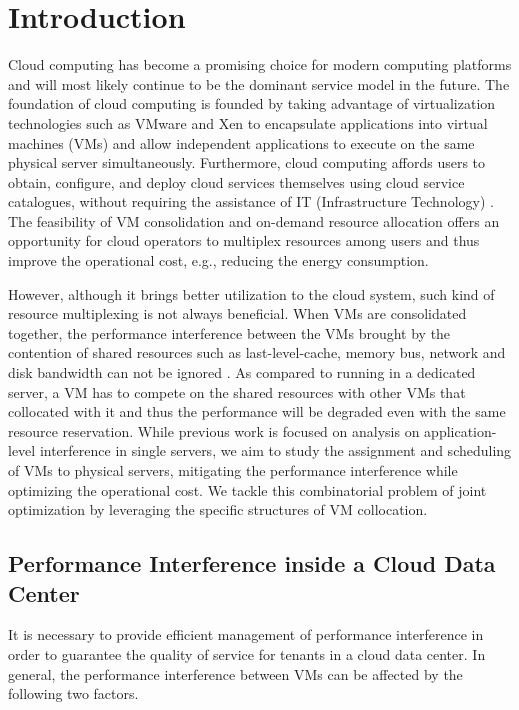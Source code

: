 \documentclass[10pt,journal]{IEEEtran}
\begin{document}
\IEEEpeerreviewmaketitle



\section{Introduction}




Cloud computing has become a promising choice for modern computing platforms and will most likely continue to be the dominant service model in the future. The foundation of cloud computing is founded by taking advantage of virtualization technologies such as VMware \cite{VMware} and Xen \cite{Xen} to encapsulate applications into virtual machines (VMs) and allow independent applications to execute on the same physical server simultaneously. Furthermore, cloud computing affords users to obtain, configure, and deploy cloud services themselves using cloud service catalogues, without requiring the assistance of IT (Infrastructure Technology) \cite{Perera12}. The feasibility of VM consolidation and on-demand resource allocation offers an opportunity for cloud operators to multiplex resources among users and thus improve the operational cost, e.g., reducing the energy consumption.

However, although it brings better utilization to the cloud system, such kind of resource multiplexing is not always beneficial. When VMs are consolidated together, the performance interference between the VMs brought by the contention of shared resources such as last-level-cache, memory bus, network and disk bandwidth can not be ignored \cite{Govindan11, Chiang11, Mars11, Roytman13, Kim13, Verboven13}. As compared to running in a dedicated server, a VM has to compete on the shared resources with other VMs that collocated with it and thus the performance will be degraded even with the same resource reservation. While previous work is focused on analysis on application-level interference in single servers, we aim to study the assignment and scheduling of VMs to physical servers, mitigating the performance interference while optimizing the operational cost. We tackle this combinatorial problem of joint optimization by leveraging the specific structures of VM collocation.

\subsection{Performance Interference inside a Cloud Data Center}

It is necessary to provide efficient management of performance interference in order to guarantee the quality of service for tenants in a cloud data center. In general, the performance interference between VMs can be affected by the following two factors.
\end{document}
